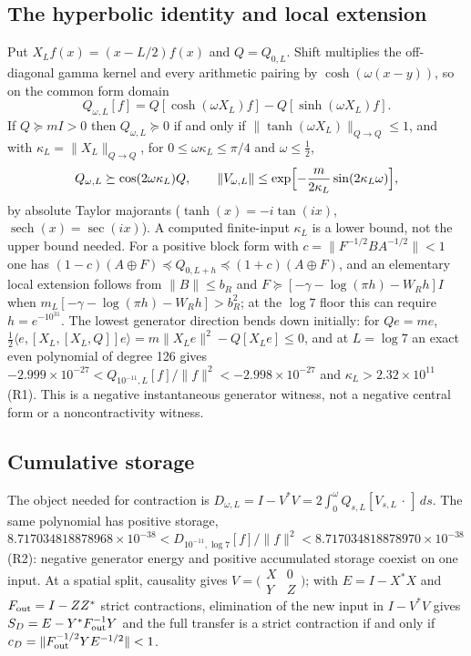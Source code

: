 \documentclass[11pt]{article}
\numberwithin{equation}{section}
\theoremstyle{definition}
\theoremstyle{remark}
\newcommand{\norm}[1]{\lVert#1\rVert}
\newcommand{\ip}[2]{\langle#1,#2\rangle}
\begin{document}
\subsection{The hyperbolic identity and local extension}
Put $X_Lf(x)=(x-L/2)f(x)$ and $Q=Q_{0,L}$. Shift multiplies the off-diagonal gamma kernel and every arithmetic pairing by $\cosh(\omega(x-y))$, so on the common form domain
\begin{equation}\label{eq:hyperbolic}
 Q_{\omega,L}[f]=Q[\cosh(\omega X_L)f]-Q[\sinh(\omega X_L)f].
\end{equation}
If $Q\succeq mI>0$ then $Q_{\omega,L}\succeq0$ if and only if $\norm{\tanh(\omega X_L)}_{Q\to Q}\le1$, and with $\kappa_L=\norm{X_L}_{Q\to Q}$, for $0\le\omega\kappa_L\le\pi/4$ and $\omega\le\tfrac12$,
\[
 Q_{\omega,L}\succeq\cos(2\omega\kappa_L)Q,\qquad \norm{V_{\omega,L}}\le\exp\Bigl[-\frac m{2\kappa_L}\sin(2\kappa_L\omega)\Bigr],
\]
by absolute Taylor majorants ($\tanh(x)=-i\tan(ix)$, $\operatorname{sech}(x)=\sec(ix)$). A computed finite-input $\kappa_L$ is a lower bound, not the upper bound needed. For a positive block form with $c=\norm{F^{-1/2}BA^{-1/2}}<1$ one has $(1-c)(A\oplus F)\preceq Q_{0,L+h}\preceq(1+c)(A\oplus F)$, and an elementary local extension follows from $\norm B\le b_R$ and $F\succeq[-\gamma-\log(\pi h)-W_Rh]I$ when $m_L[-\gamma-\log(\pi h)-W_Rh]>b_R^2$; at the $\log7$ floor this can require $h=e^{-10^{31}}$. The lowest generator direction bends down initially: for $Qe=me$, $\tfrac12\ip e{[X_L,[X_L,Q]]e}=m\norm{X_Le}^2-Q[X_Le]\le0$, and at $L=\log7$ an exact even polynomial of degree 126 gives $-2.999\times10^{-27}<Q_{10^{-11},L}[f]/\norm f^2<-2.998\times10^{-27}$ and $\kappa_L>2.32\times10^{11}$ (R1). This is a negative instantaneous generator witness, not a negative central form or a noncontractivity witness.

\subsection{Cumulative storage}
The object needed for contraction is $D_{\omega,L}=I-V^*V=2\int_0^\omega Q_{s,L}[V_{s,L}\,\cdot\,]\,ds$. The same polynomial has positive storage, $8.717034818878968\times10^{-38}<D_{10^{-11},\log7}[f]/\norm f^2<8.717034818878970\times10^{-38}$ (R2): negative generator energy and positive accumulated storage coexist on one input. At a spatial split, causality gives $V=\bigl(\begin{smallmatrix}X&0\\Y&Z\end{smallmatrix}\bigr)$; with $E=I-X^*X$ and $F_{\rm out}=I-ZZ^*$ strict contractions, elimination of the new input in $I-V^*V$ gives $S_D=E-Y^*F_{\rm out}^{-1}Y$ and the full transfer is a strict contraction if and only if $c_D=\norm{F_{\rm out}^{-1/2}YE^{-1/2}}<1$.
\end{document}
